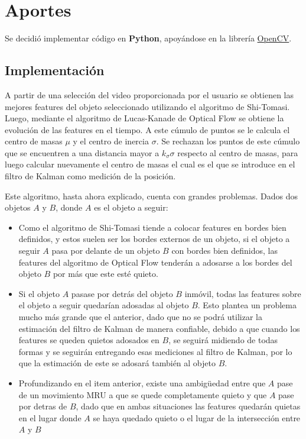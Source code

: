 \section{Aportes}

Se decidió implementar código en \textbf{Python}, apoyándose en la librería \href{https://opencv.org/}{OpenCV}.

\subsection{Implementación}
A partir de una selección del video proporcionada por el usuario se obtienen las mejores features del objeto seleccionado utilizando el algoritmo de Shi-Tomasi. Luego, mediante el algoritmo de Lucas-Kanade de Optical Flow se obtiene la evolución de las features en el tiempo. A este cúmulo de puntos se le calcula el centro de masas $\mu$ y el centro de inercia $\sigma$. Se rechazan los puntos de este cúmulo que se encuentren a una distancia mayor a $k_{\sigma}\sigma$ respecto al centro de masas, para luego calcular nuevamente el centro de masas el cual es el que se introduce en el filtro de Kalman como medición de la posición.


Este algoritmo, hasta ahora explicado, cuenta con grandes problemas. Dados dos objetos $A$ y $B$, donde $A$ es el objeto a seguir:

\begin{itemize}
\item Como el algoritmo de Shi-Tomasi tiende a colocar features en bordes bien definidos, y estos suelen ser los bordes externos de un objeto, si el objeto a seguir $A$ pasa por delante de un objeto $B$ con bordes bien definidos, las features del algoritmo de Optical Flow tenderán a adosarse a los bordes del objeto $B$ por más que este esté quieto.
\item Si el objeto $A$ pasase por detrás del objeto $B$ inmóvil, todas las features sobre el objeto a seguir quedarían adosadas al objeto $B$. Esto plantea un problema mucho más grande que el anterior, dado que no se podrá utilizar la estimación del filtro de Kalman de manera confiable, debido a que cuando los features se queden quietos adosados en $B$, se seguirá midiendo de todas formas y se seguirán entregando esas mediciones al filtro de Kalman, por lo que la estimación de este se adosará también al objeto $B$.
\item Profundizando en el item anterior, existe una ambigüedad entre que $A$ pase de un movimiento MRU a que se quede completamente quieto y que $A$ pase por detras de $B$, dado que en ambas situaciones las features quedarán quietas en el lugar donde $A$ se haya quedado quieto o el lugar de la intersección entre $A$ y $B$
\end{itemize}

